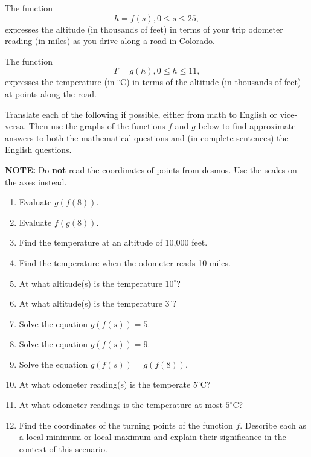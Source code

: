 \documentclass{ximera}
\begin{document}
\begin{example}  \label{Ex3:Comp}
The function
\[
     h = f(s) , 0\leq s \leq 25 ,
\]
expresses the altitude (in thousands of feet) in terms of your trip odometer reading (in miles) as you drive along a road in Colorado. 

The function 
\[
  T = g(h) , 0\leq h \leq 11 ,
\]
expresses the temperature (in $^\circ$C) in terms of the altitude (in thousands of feet) at points along the road.

Translate each of the following if possible, either from math to English or vice-versa. Then use the graphs of the functions $f$ and $g$ below to find approximate answers to both the mathematical questions and (in complete sentences) the English questions.

{\bf NOTE:} Do {\bf not} read the coordinates of points from desmos. Use the scales on the axes instead.

\begin{enumerate}
\item Evaluate $g(f(8))$.

\item  Evaluate $f(g(8))$.

\item  Find the temperature at an altitude of 10,000 feet.

\item Find the temperature when the odometer reads 10 miles.

\item At what altitude(s) is the temperature $10^\circ$?

\item At what altitude(s) is the temperature $3^\circ$?

\item Solve the equation $g(f(s)) = 5$.

\item Solve the equation $g(f(s)) = 9$.

\item Solve the equation $g(f(s)) = g(f(8))$.

\item At what odometer reading(s) is the temperate $5^\circ$C?

\item At what odometer readings is the temperature at most $5^\circ$C?

\item Find the coordinates of the turning points of the function $f$. Describe each as a local minimum or local maximum and explain their significance in the context of this scenario.


\end{enumerate}
\end{example}
\end{document}
